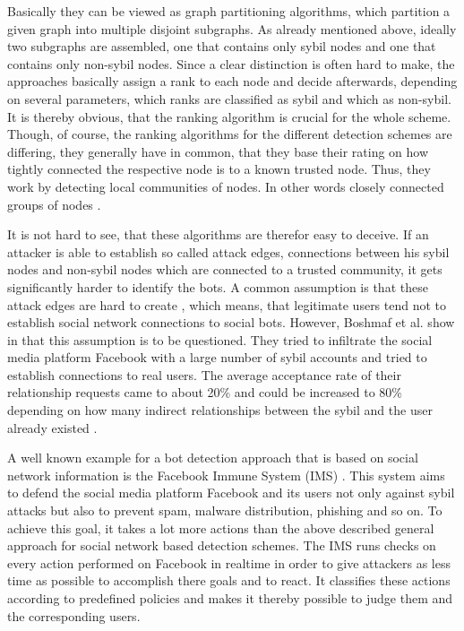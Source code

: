 Basically they can be viewed as graph partitioning algorithms, which partition a given graph into multiple disjoint subgraphs. As already mentioned above, ideally two subgraphs are assembled, one that contains only sybil nodes and one that contains only non-sybil nodes. Since a clear distinction is often hard to make, the approaches basically assign a rank to each node and decide afterwards, depending on several parameters, which ranks are classified as sybil and which as non-sybil. It is thereby obvious, that the ranking algorithm is crucial for the whole scheme. Though, of course, the ranking algorithms for the different detection schemes are differing, they generally have in common, that they base their rating on how tightly connected the respective node is to a known trusted node. Thus, they work by detecting local communities of nodes. In other words closely connected groups of nodes \cite{comparison}.

It is not hard to see, that these algorithms are therefor easy to deceive. If an attacker is able to establish so called attack edges, connections between his sybil nodes and non-sybil nodes which are connected to a trusted community, it gets significantly harder to identify the bots. A common assumption is that these attack edges are hard to create \cite{sybilguard}, which means, that legitimate users tend not to establish social network connections to social bots. However, Boshmaf et al. show in \cite{boshmaf11} that this assumption is to be questioned. 
They tried to infiltrate the social media platform Facebook with a large number of sybil accounts and tried to establish connections to real users. The average acceptance rate of their relationship requests came to about 20\% and could be increased to 80\% depending on how many indirect relationships between the sybil and the user already existed \cite{boshmaf11}. %

A well known example for a bot detection approach that is based on social network information is the Facebook Immune System (IMS) \cite{fis}. This system aims to defend the social media platform Facebook and its users not only against sybil attacks but also to prevent spam, malware distribution, phishing and so on.  To achieve this goal, it takes a lot more actions than the above described general approach for social network based detection schemes. The IMS runs checks on every action performed on Facebook in realtime in order to give attackers as less time as possible to accomplish there goals and to react. It classifies these actions according to predefined policies and makes it thereby possible to judge them and the corresponding users.

